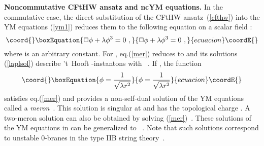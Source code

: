 \documentclass[a4paper,11pt]{article}
\numberwithin{equation}{section}
\def\l{\lambda}
\def\p{\phi}
\providecommand{\rc}{{\mathbb{R}^4}}
\providecommand{\R}{{\mathbb{R}}}
\begin{document}
{\bf Noncommutative CFtHW ansatz and ncYM equations.}
In the commutative case, the direct substitution of the CFtHW ansatz~(\ref{cfthw})
into the YM equations (\ref{ym1}) reduces them to the following equation
on a scalar field \myHighlight{$\p$}\coordHE{}:
\begin{equation}\coord{}\boxEquation{\label{mer}
\Box\p + \l\p^3 =0\ ,
}{\Box\p + \l\p^3 =0\ ,
}{ecuacion}\coordE{}\end{equation}
where \myHighlight{$\l$}\coordHE{} is an arbitrary constant. For \myHighlight{$\l =0$}\coordHE{}, eq.(\ref{mer}) reduces to 
\myHighlight{$\Box\p =0$}\coordHE{} and its solutions (\ref{laplsol}) describe 't~Hooft \coordHE{}-instantons 
 with \coordHE{}\ . If \myHighlight{$\l\ne 0$}\coordHE{}, the function  
\begin{equation}\coord{}\boxEquation{\label{me}
\p =\frac{1}{\sqrt{\l r^2}}
}{\p =\frac{1}{\sqrt{\l r^2}}
}{ecuacion}\coordE{}\end{equation}
satisfies eq.(\ref{mer}) and provides a non-self-dual solution of the YM equations 
called a {\it meron}~\cite{AFF, Callan}. This solution is singular at \coordHE{} and has the
topological charge \coordHE{}. A two-meron solution can also be obtained by solving 
(\ref{mer})~\cite{AFF, Callan, Actor}. These solutions of the YM equations in \myHighlight{$\rc$}\coordHE{} 
can be generalized to \myHighlight{$\R^{4n}$}\coordHE{}~\cite{Popov}. Note that such solutions correspond
to unstable \coordHE{}0-branes in the type IIB string theory~\cite{Druk}.
\end{document}

